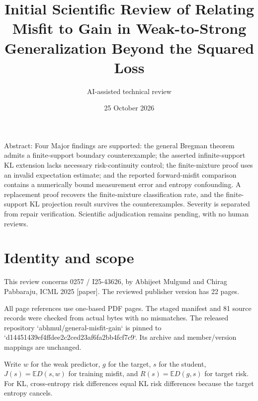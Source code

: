 \documentclass[10pt]{article}
\title{Initial Scientific Review of
Relating Misfit to Gain in Weak-to-Strong Generalization Beyond the Squared Loss}
\author{AI-assisted technical review}
\date{25 October 2026}
\begin{document}
\maketitle
Abstract: Four Major findings are supported: the general Bregman theorem admits a finite-support boundary counterexample; the asserted infinite-support KL extension lacks necessary risk-continuity control; the finite-mixture proof uses an invalid expectation estimate; and the reported forward-misfit comparison contains a numerically bound measurement error and entropy confounding. A replacement proof recovers the finite-mixture classification rate, and the finite-support KL projection result survives the counterexamples. Severity is separated from repair verification. Scientific adjudication remains pending, with no human reviews.\par
\section*{Identity and scope}
This review concerns 0257 / I25-43626, by Abhijeet Mulgund and Chirag Pabbaraju, ICML 2025 [paper]. The reviewed publisher version has 22 pages.\par
All page references use one-based PDF pages. The staged manifest and 81 source records were checked from actual bytes with no mismatches. The released repository `abhmul/general-misfit-gain` is pinned to `d14451439ef4ffdee2c2ced23af6fa2bb4fcf7c9`. Its archive and member/version mappings are unchanged.\par
Write \(w\) for the weak predictor, \(g\) for the target, \(s\) for the student, \(J(s)=\mathbb E D(s,w)\) for training misfit, and \(R(s)=\mathbb E D(g,s)\) for target risk. For KL, cross-entropy risk differences equal KL risk differences because the target entropy cancels.\par
\end{document}
